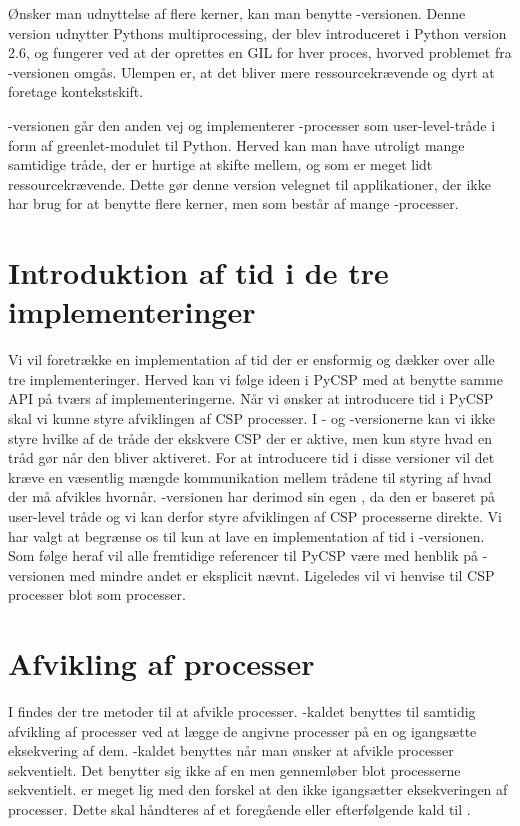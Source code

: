 Ønsker man udnyttelse af flere kerner, kan man benytte -versionen. Denne version udnytter Pythons multiprocessing, der blev introduceret i Python version 2.6, og fungerer ved at der oprettes en GIL for hver proces, hvorved problemet fra -versionen omgås. Ulempen er, at det bliver mere ressourcekrævende og dyrt at foretage kontekstskift. 

-versionen går den anden vej og implementerer \csp-processer som user-level-tråde i form af greenlet-modulet til Python\cite{greenlet}. Herved kan man have utroligt mange samtidige tråde, der er hurtige at skifte mellem, og som er meget lidt ressourcekrævende. Dette gør denne version velegnet til applikationer, der ikke har brug for at benytte flere kerner, men som består af mange \csp-processer. 

\section{Introduktion af tid i de tre implementeringer}
Vi vil foretrække en implementation af tid der er ensformig og dækker over alle tre implementeringer. Herved kan vi følge ideen i PyCSP med at benytte samme API på tværs af implementeringerne. Når vi ønsker at introducere tid i PyCSP skal vi kunne styre afviklingen af CSP processer. I  - og -versionerne kan vi ikke styre hvilke af de tråde der ekskvere CSP der er aktive, men kun styre hvad en tråd gør når den bliver aktiveret. For at introducere tid i disse versioner vil det kræve en væsentlig mængde kommunikation mellem trådene til styring af hvad der må afvikles hvornår. -versionen har derimod sin egen \sched , da den er baseret på user-level tråde og vi kan derfor styre afviklingen af CSP processerne direkte. Vi har valgt at begrænse os til kun at lave en implementation af tid i -versionen. Som følge heraf vil alle fremtidige referencer til PyCSP være med henblik på -versionen med mindre andet er eksplicit nævnt. Ligeledes vil vi henvise til CSP processer blot som processer. 

\section{Afvikling af processer}
I \pycsp findes der tre metoder til at afvikle processer. -kaldet benyttes til samtidig afvikling af processer ved at lægge de angivne processer på \sched en og igangsætte eksekvering af dem. -kaldet benyttes når man ønsker at afvikle processer sekventielt. Det benytter sig ikke af \sched en men gennemløber blot processerne sekventielt.  er meget lig  med den forskel at den ikke igangsætter eksekveringen af processer. Dette skal håndteres af et foregående eller efterfølgende kald til . 


